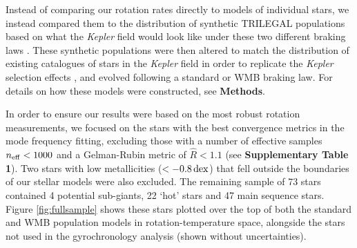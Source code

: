 \documentclass[12pt]{article}
\newcommand{\kepler}{\emph{Kepler}\xspace}
\newcommand{\rtwo}[1]{{#1}}
\begin{document}
Instead of comparing our rotation rates directly to models of individual stars, we instead compared them to \rtwo{the distribution of} synthetic TRILEGAL populations based on what the \textit{Kepler} field would look like under these two different braking laws \cite{vansaders+2019, girardi+2012}. These synthetic populations were then altered to match the distribution of existing catalogues of stars in the \kepler field in order to replicate the \kepler selection effects \cite{berger+2020}, and evolved following a standard or WMB braking law. For details on how these models were constructed, see \textbf{Methods}.

In order to ensure our results were based on the most robust rotation measurements, we focused on the stars with the best convergence metrics in the mode frequency fitting, excluding those with a number of effective samples $n_{\rm eff} < 1000$ and a Gelman-Rubin metric of $\hat{R}<1.1$ \cite{gelman+rubin1992,salvatier+2016} (see  \textbf{Supplementary Table 1}). Two stars with low metallicities ($< -0.8\, \rm {dex}$) that fell outside the boundaries of our stellar models were also excluded. The remaining sample of 73 stars contained 4 potential sub-giants, 22 `hot' stars and 47 main sequence stars. Figure \ref{fig:fullsample} shows these stars plotted over the top of both the standard and WMB population models in rotation-temperature space, alongside the stars not used in the gyrochronology analysis (shown without uncertainties).
\end{document}
